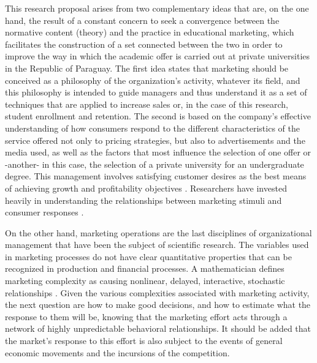 \documentclass[english]{textolivre}
\begin{document}
This research proposal arises from two complementary ideas that are, on the one hand, the result of a constant concern to seek a convergence between the normative content (theory) and the practice in educational marketing, which facilitates the construction of a set connected between the two in order to improve the way in which the academic offer is carried out at private universities in the Republic of Paraguay. The first idea states that marketing should be conceived as a philosophy of the organization's activity, whatever its field, and this philosophy is intended to guide managers and thus understand it as a set of techniques that are applied to increase sales or, in the case of this research, student enrollment and retention. The second is based on the company's effective understanding of how consumers respond to the different characteristics of the service offered not only to pricing strategies, but also to advertisements and the media used, as well as the factors that most influence the selection of one offer or -another- in this case, the selection of a private university for an undergraduate degree. This management involves satisfying customer desires as the best means of achieving growth and profitability objectives \cite{lambin_strategic_1992}. Researchers have invested heavily in understanding the relationships between marketing stimuli and consumer responses \cite{kotler_marketing_2009}.

On the other hand, marketing operations are the last disciplines of organizational management that have been the subject of scientific research. The variables used in marketing processes do not have clear quantitative properties that can be recognized in production and financial processes. A mathematician defines marketing complexity as causing nonlinear, delayed, interactive, stochastic relationships \cite{kotler_marketing_2009}. Given the various complexities associated with marketing activity, the next question are how to make good decisions, and how to estimate what the response to them will be, knowing that the marketing effort acts through a network of highly unpredictable behavioral relationships. It should be added that the market's response to this effort is also subject to the events of general economic movements and the incursions of the competition.
\end{document}
